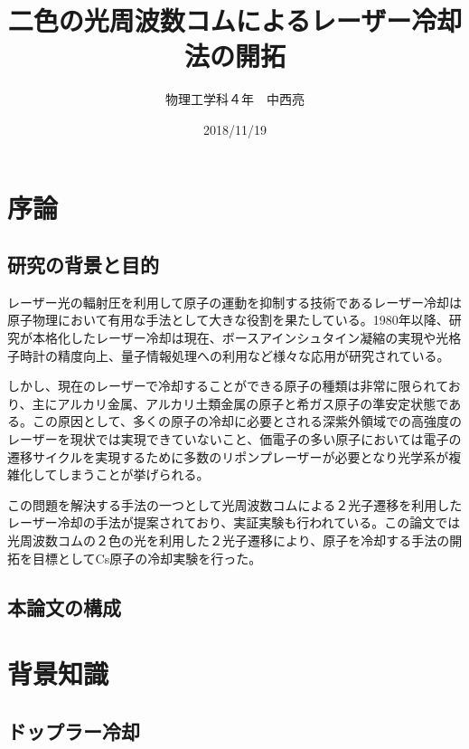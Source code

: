 \documentclass[uplatex,dvipdfmx,a4paper,report,papersize,11pt]{jsbook}
\title{二色の光周波数コムによるレーザー冷却法の開拓}
\author{物理工学科４年　中西亮}
\date{2018/11/19}
\begin{document}
\maketitle
\newpage

\setcounter{tocdepth}{2}
\tableofcontents


\newpage
\chapter{序論}
\section{研究の背景と目的}
レーザー光の輻射圧を利用して原子の運動を抑制する技術であるレーザー冷却は原子物理において有用な手法として大きな役割を果たしている。1980年以降、研究が本格化したレーザー冷却は現在、ボースアインシュタイン凝縮の実現や光格子時計の精度向上、量子情報処理への利用など様々な応用が研究されている。\cite{レーザー冷却とその応用}\par
しかし、現在のレーザーで冷却することができる原子の種類は非常に限られており、主にアルカリ金属、アルカリ土類金属の原子と希ガス原子の準安定状態である。\cite{PhysRevA.73.063407}この原因として、多くの原子の冷却に必要とされる深紫外領域での高強度のレーザーを現状では実現できていないこと、価電子の多い原子においては電子の遷移サイクルを実現するために多数のリポンプレーザーが必要となり光学系が複雑化してしまうことが挙げられる。\par
この問題を解決する手法の一つとして光周波数コムによる２光子遷移を利用したレーザー冷却の手法が提案されており、実証実験も行われている\cite{PhysRevX.6.041004}\cite{PhysRevA.73.063407}。この論文では光周波数コムの２色の光を利用した２光子遷移により、原子を冷却する手法の開拓を目標としてCs原子の冷却実験を行った。\\



\section{本論文の構成}

\newpage

\chapter{背景知識}

\section{ドップラー冷却}
\end{document}
